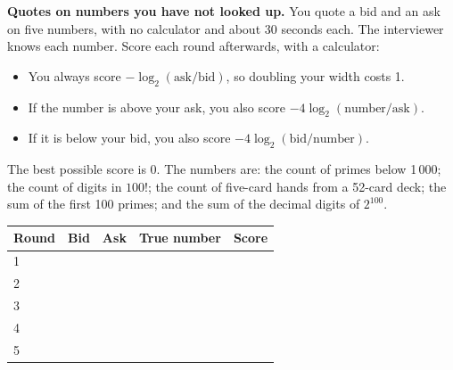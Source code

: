 \begin{question}\label{iq:iv2:played-games:5}
\textbf{Quotes on numbers you have not looked up.} You quote a bid and an ask on five numbers, with no calculator and about 30 seconds each. The interviewer knows each number. Score each round afterwards, with a calculator:
\begin{itemize}
\item You always score $-\log_2(\text{ask}/\text{bid})$, so doubling your width costs 1.
\item If the number is above your ask, you also score $-4\log_2(\text{number}/\text{ask})$.
\item If it is below your bid, you also score $-4\log_2(\text{bid}/\text{number})$.
\end{itemize}
The best possible score is 0. The numbers are: the count of primes below 1\,000; the count of digits in $100!$; the count of five-card hands from a 52-card deck; the sum of the first 100 primes; and the sum of the decimal digits of $2^{100}$.

\medskip
\begin{tabular}{@{}l|l|l|l|l@{}}
Round & Bid & Ask & True number & Score \\ \hline
1 & & & & \\[8pt]\hline
2 & & & & \\[8pt]\hline
3 & & & & \\[8pt]\hline
4 & & & & \\[8pt]\hline
5 & & & & \\[8pt]\hline
\end{tabular}
\end{question}
\vfill\clearpage

